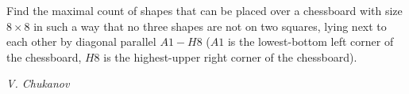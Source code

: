 Find the maximal count of shapes that can be placed over a chessboard with size $8\times8$ in such a way that no three shapes are not on two squares, lying next to each other by diagonal parallel $A1-H8$ ($A1$ is the lowest-bottom left corner of the chessboard, $H8$ is the highest-upper right corner of the chessboard).

\textit{V. Chukanov}
